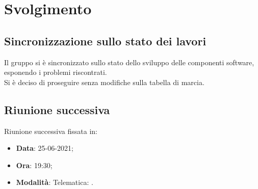 \documentclass[]{article}
\begin{document}
	\newpage

	\section{Svolgimento}
		\subsection{Sincronizzazione sullo stato dei lavori}
		Il gruppo si è sincronizzato sullo stato dello sviluppo delle componenti software, esponendo i problemi riscontrati.\\
		Si è deciso di proseguire senza modifiche sulla tabella di marcia.\\
		
		\subsection{Riunione successiva}
		Riunione successiva fissata in:
		\begin{itemize}
			\item \textbf{Data}: 25-06-2021;
			\item \textbf{Ora}: 19:30;
			\item \textbf{Modalità}: Telematica: .
		\end{itemize}
\end{document}
